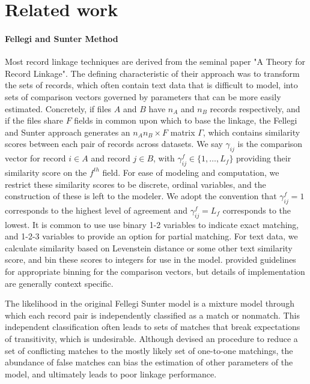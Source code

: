 \documentclass[12pt,letterpaper]{article}
\newcommand{\1}[1]{\mathbb{I}\!\left[#1\right]} %
\begin{document}
\section{Related work}
\label{sec:related}

\paragraph{Fellegi and Sunter Method}
Most record linkage techniques are derived from the seminal \citep{fs} paper "A Theory for Record Linkage". The defining
characteristic of their approach was to transform the sets of records,
which often contain text data that is difficult to model, into sets of
comparison vectors governed by parameters that can be more easily
estimated. Concretely, if files \(A\) and \(B\) have \(n_A\) and \(n_B\)
records respectively, and if the files share \(F\) fields in common upon
which to base the linkage, the Fellegi and Sunter approach generates an
\(n_A n_B \times F\) matrix \(\Gamma\), which contains similarity scores
between each pair of records across datasets. We say \(\gamma_{ij}\) is
the comparison vector for record \(i \in A\) and record \(j \in B\),
with \(\gamma_{ij}^f \in \{1, \ldots, L_f\}\) providing their similarity
score on the \(f^{th}\) field. For ease of modeling and computation, we
restrict these similarity scores to be discrete, ordinal variables, and
the construction of these is left to the modeler. We adopt the
convention that \(\gamma_{ij}^f = 1\) corresponds to the highest level
of agreement and \(\gamma_{ij}^f = L_f\) corresponds to the lowest. It
is common to use use binary 1-2 variables to indicate exact matching,
and 1-2-3 variables to provide an option for partial matching. For text
data, we calculate similarity based on Levenstein distance or some other
text similarity score, and bin these scores to integers for use in the
model. \citep{jaro1989} provided guidelines for appropriate binning for the
comparison vectors, but details of implementation are generally context
specific.

The likelihood in the original Fellegi Sunter model is a mixture model
through which each record pair is independently classified as a match or
nonmatch. This independent classification often leads to sets of matches
that break expectations of transitivity, which is undesirable. Although
\citep{jaro1995} devised an procedure to reduce a set of conflicting matches to the
mostly likely set of one-to-one matchings, the abundance of false
matches can bias the estimation of other parameters of the model, and ultimately leads to poor linkage performance. 
\end{document}
